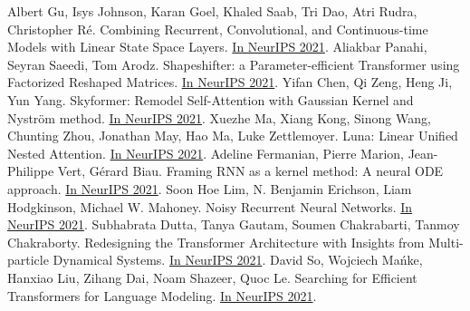 \documentclass[b5paper,xelatex,ja=standard,10pt]{bxjsarticle}
\begin{document}
\begin{thebibliography}{99}
     Albert Gu, Isys Johnson, Karan Goel, Khaled Saab, Tri Dao, Atri Rudra, Christopher Ré. Combining Recurrent, Convolutional, and Continuous-time Models with Linear State Space Layers. {\href{https://proceedings.neurips.cc/paper/2021/hash/05546b0e38ab9175cd905eebcc6ebb76-Abstract.html}{In NeurIPS 2021}}.
     Aliakbar Panahi, Seyran Saeedi, Tom Arodz. Shapeshifter: a Parameter-efficient Transformer using Factorized Reshaped Matrices. {\href{https://proceedings.neurips.cc/paper/2021/hash/09def3ebbc44ff3426b28fcd88c83554-Abstract.html}{In NeurIPS 2021}}.
     Yifan Chen, Qi Zeng, Heng Ji, Yun Yang. Skyformer: Remodel Self-Attention with Gaussian Kernel and Nyström method. {\href{https://proceedings.neurips.cc/paper/2021/hash/10a7cdd970fe135cf4f7bb55c0e3b59f-Abstract.html}{In NeurIPS 2021}}.
     Xuezhe Ma, Xiang Kong, Sinong Wang, Chunting Zhou, Jonathan May, Hao Ma, Luke Zettlemoyer. Luna: Linear Unified Nested Attention. {\href{https://proceedings.neurips.cc/paper/2021/hash/14319d9cfc6123106878dc20b94fbaf3-Abstract.html}{In NeurIPS 2021}}.
     Adeline Fermanian, Pierre Marion, Jean-Philippe Vert, Gérard Biau. Framing RNN as a kernel method: A neural ODE approach. {\href{https://proceedings.neurips.cc/paper/2021/hash/18a9042b3fc5b02fe3d57fea87d6992f-Abstract.html}{In NeurIPS 2021}}.
     Soon Hoe Lim, N. Benjamin Erichson, Liam Hodgkinson, Michael W. Mahoney. Noisy Recurrent Neural Networks. {\href{https://proceedings.neurips.cc/paper/2021/hash/29301521774ff3cbd26652b2d5c95996-Abstract.html}{In NeurIPS 2021}}.
     Subhabrata Dutta, Tanya Gautam, Soumen Chakrabarti, Tanmoy Chakraborty. Redesigning the Transformer Architecture with Insights from Multi-particle Dynamical Systems. {\href{https://proceedings.neurips.cc/paper/2021/hash/2bd388f731f26312bfc0fe30da009595-Abstract.html}{In NeurIPS 2021}}.
     David So, Wojciech Mańke, Hanxiao Liu, Zihang Dai, Noam Shazeer, Quoc Le. Searching for Efficient Transformers for Language Modeling. {\href{https://proceedings.neurips.cc/paper/2021/hash/2f3c6a4cd8af177f6456e7e51a916ff3-Abstract.html}{In NeurIPS 2021}}.

\end{thebibliography}
\end{document}
